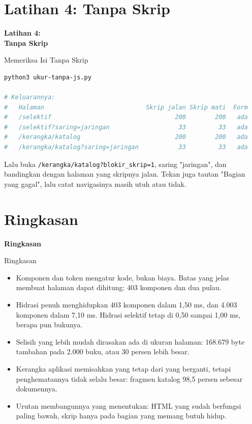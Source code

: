 \documentclass[aspectratio=169, table, 12pt]{beamer}
\begin{document}
\section{Latihan 4: Tanpa Skrip}

\begin{frame}{\hfill}
  \centering
  \Huge{\textbf{Latihan 4:\\Tanpa Skrip}}
\end{frame}

\begin{frame}[fragile]{{\Large Memeriksa Isi Tanpa Skrip}}
  \vspace{2pt}
\begin{lstlisting}[language=bash]
python3 ukur-tanpa-js.py

# Keluarannya:
#   Halaman                            Skrip jalan Skrip mati  Form
#   /selektif                                  200        200   ada
#   /selektif?saring=jaringan                   33         33   ada
#   /kerangka/katalog                          200        200   ada
#   /kerangka/katalog?saring=jaringan           33         33   ada
\end{lstlisting}
  \vspace{2pt}
  {\small Lalu buka \texttt{/kerangka/katalog?blokir\_skrip=1}, saring
  "jaringan", dan bandingkan dengan halaman yang skripnya jalan. Tekan juga
  tautan "Bagian yang gagal", lalu catat navigasinya masih utuh atau tidak.}
\end{frame}

\section{Ringkasan}

\begin{frame}{\hfill}
  \centering
  \Huge{\textbf{Ringkasan}}
\end{frame}

\begin{frame}{{\Large Ringkasan}}
  \vspace{8pt}
  \begin{itemize}
    \item Komponen dan token mengatur kode, bukan biaya. Batas yang jelas
          membuat halaman dapat dihitung: 403 komponen dan dua pulau.
    \item Hidrasi penuh menghidupkan 403 komponen dalam 1,50 ms, dan 4.003
          komponen dalam 7,10 ms. Hidrasi selektif tetap di 0,50 sampai 1,00
          ms, berapa pun bukunya.
    \item Selisih yang lebih mudah dirasakan ada di ukuran halaman: 168.679
          byte tambahan pada 2.000 buku, atau 30 persen lebih besar.
    \item Kerangka aplikasi memisahkan yang tetap dari yang berganti, tetapi
          penghematannya tidak selalu besar: fragmen katalog 98,5 persen
          sebesar dokumennya.
    \item Urutan membangunnya yang menentukan: HTML yang sudah berfungsi
          paling bawah, skrip hanya pada bagian yang memang butuh hidup.
  \end{itemize}
\end{frame}
\end{document}
